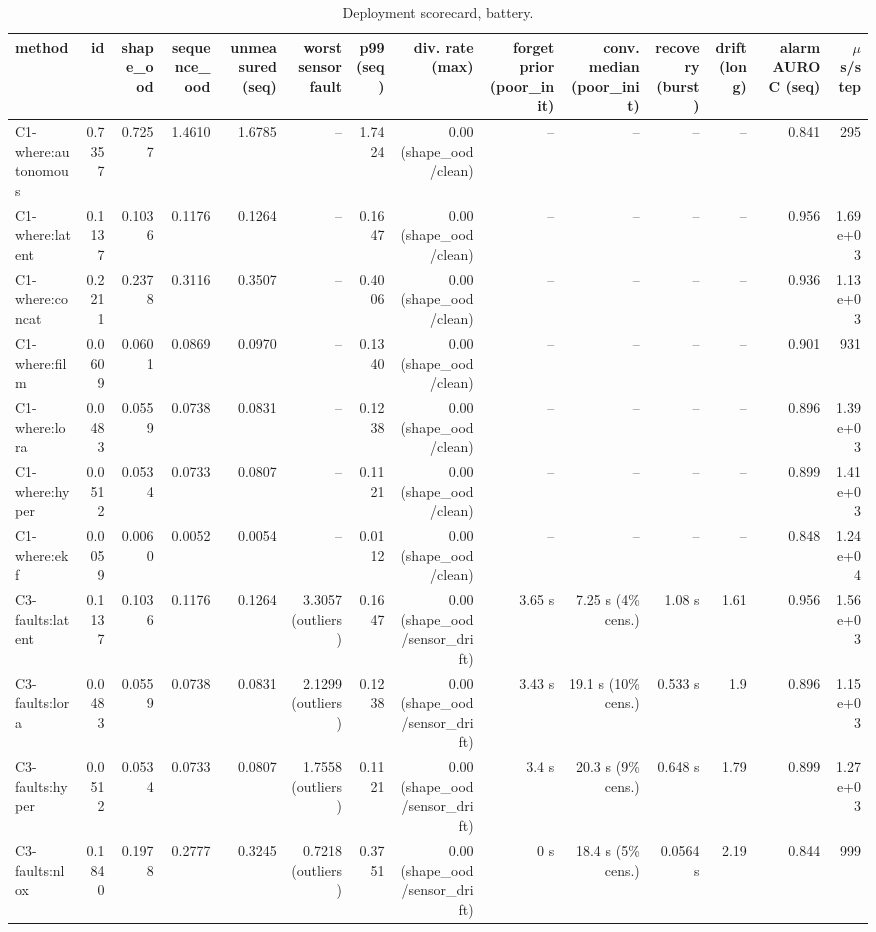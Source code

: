 \begin{table}[t]
\centering
\scriptsize
\caption{Deployment scorecard, battery.}
\begin{tabular}{lrrrrrrrrrrrrr}
\toprule
method & id & shape\_ood & sequence\_ood & unmeasured (seq) & worst sensor fault & p99 (seq) & div. rate (max) & forget prior (poor\_init) & conv. median (poor\_init) & recovery (burst) & drift (long) & alarm AUROC (seq) & $\mu$s/step \\
\midrule
C1-where:autonomous & 0.7357 & 0.7257 & 1.4610 & 1.6785 & – & 1.7424 & 0.00 (shape\_ood/clean) & – & – & – & – & 0.841 & 295 \\
C1-where:latent & 0.1137 & 0.1036 & 0.1176 & 0.1264 & – & 0.1647 & 0.00 (shape\_ood/clean) & – & – & – & – & 0.956 & 1.69e+03 \\
C1-where:concat & 0.2211 & 0.2378 & 0.3116 & 0.3507 & – & 0.4006 & 0.00 (shape\_ood/clean) & – & – & – & – & 0.936 & 1.13e+03 \\
C1-where:film & 0.0609 & 0.0601 & 0.0869 & 0.0970 & – & 0.1340 & 0.00 (shape\_ood/clean) & – & – & – & – & 0.901 & 931 \\
C1-where:lora & 0.0483 & 0.0559 & 0.0738 & 0.0831 & – & 0.1238 & 0.00 (shape\_ood/clean) & – & – & – & – & 0.896 & 1.39e+03 \\
C1-where:hyper & 0.0512 & 0.0534 & 0.0733 & 0.0807 & – & 0.1121 & 0.00 (shape\_ood/clean) & – & – & – & – & 0.899 & 1.41e+03 \\
C1-where:ekf & 0.0059 & 0.0060 & 0.0052 & 0.0054 & – & 0.0112 & 0.00 (shape\_ood/clean) & – & – & – & – & 0.848 & 1.24e+04 \\
C3-faults:latent & 0.1137 & 0.1036 & 0.1176 & 0.1264 & 3.3057 (outliers) & 0.1647 & 0.00 (shape\_ood/sensor\_drift) & 3.65 s & 7.25 s (4\% cens.) & 1.08 s & 1.61 & 0.956 & 1.56e+03 \\
C3-faults:lora & 0.0483 & 0.0559 & 0.0738 & 0.0831 & 2.1299 (outliers) & 0.1238 & 0.00 (shape\_ood/sensor\_drift) & 3.43 s & 19.1 s (10\% cens.) & 0.533 s & 1.9 & 0.896 & 1.15e+03 \\
C3-faults:hyper & 0.0512 & 0.0534 & 0.0733 & 0.0807 & 1.7558 (outliers) & 0.1121 & 0.00 (shape\_ood/sensor\_drift) & 3.4 s & 20.3 s (9\% cens.) & 0.648 s & 1.79 & 0.899 & 1.27e+03 \\
C3-faults:nlox & 0.1840 & 0.1978 & 0.2777 & 0.3245 & 0.7218 (outliers) & 0.3751 & 0.00 (shape\_ood/sensor\_drift) & 0 s & 18.4 s (5\% cens.) & 0.0564 s & 2.19 & 0.844 & 999 \\

\end{tabular}
\end{table}
